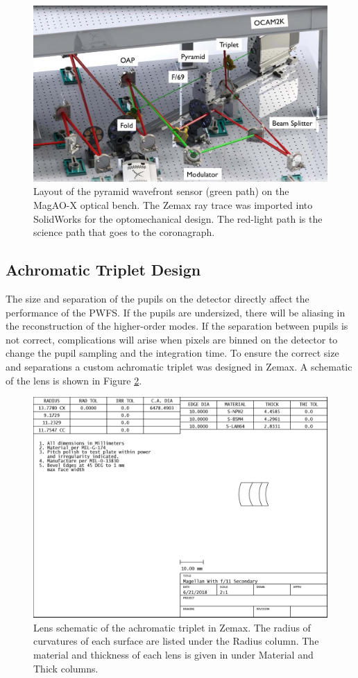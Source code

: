 \begin{figure}
    \centering
    \includegraphics[width=.8\textwidth]{Chapter Materials/Chapter Three Materials/PWFSOptoMech.jpg}
    \caption{Layout of the pyramid wavefront sensor (green path) on the MagAO-X optical bench. The Zemax ray trace was imported into SolidWorks for the optomechanical design. The red-light path is the science path that goes to the coronagraph.}
    \label{fig:oplayout}
\end{figure}
	
	
	
	
\subsection{Achromatic Triplet Design}

The size and separation of the pupils on the detector directly affect the performance of the PWFS. If the pupils are undersized, there will be aliasing in the reconstruction of the higher-order modes. If the separation between pupils is not correct, complications will arise when pixels are binned on the detector to change the pupil sampling and the integration time.  To ensure the correct size and separations a custom achromatic triplet was designed in Zemax. A schematic of the lens is shown in Figure \ref{fig:triplet}. 

\begin{figure}[h]
	\centering
	\includegraphics[width=.8\textwidth]{Chapter Materials/Chapter Three Materials/cameralenstripletSPEC.jpg}
	\caption{Lens schematic of the achromatic triplet in Zemax. The radius of curvatures of each surface are listed under the Radius column. The material and thickness of each lens is given in under Material and Thick columns.  }
	\label{fig:triplet}
\end{figure}


